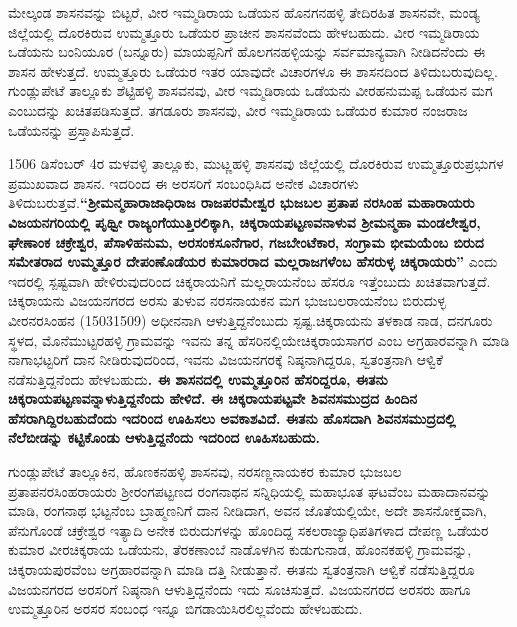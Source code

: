 ಮೇಲ್ಕಂಡ ಶಾಸನವನ್ನು ಬಿಟ್ಟರೆ, ವೀರ ಇಮ್ಮಡಿರಾಯ ಒಡೆಯನ ಹೊನಗನಹಳ್ಳಿ ತೇದಿರಹಿತ ಶಾಸನವೇ, ಮಂಡ್ಯ ಜಿಲ್ಲೆಯಲ್ಲಿ ದೊರಕಿರುವ ಉಮ್ಮತ್ತೂರು ಒಡೆಯರ ಪ್ರಾಚೀನ ಶಾಸನವೆಂದು ಹೇಳಬಹುದು. ವೀರ ಇಮ್ಮಡಿರಾಯ ಒಡೆಯನು ಬಂನಿಯೂರ (ಬನ್ನೂರು) ಮಾಯಪ್ಪನಿಗೆ ಹೊಲಗನಹಳ್ಳಿಯನ್ನು ಸರ್ವಮಾನ್ಯವಾಗಿ ನೀಡಿದನೆಂದು ಈ ಶಾಸನ ಹೇಳುತ್ತದೆ. ಉಮ್ಮತ್ತೂರು ಒಡೆಯರ ಇತರ ಯಾವುದೇ ವಿಚಾರಗಳೂ ಈ ಶಾಸನದಿಂದ ತಿಳಿದುಬರುವುದಿಲ್ಲ. ಗುಂಡ್ಲುಪೇಟೆ ತಾಲ್ಲೂಕು ಶೆಟ್ಟಿಹಳ್ಳಿ ಶಾಸವನವು, ವೀರ ಇಮ್ಮಡಿರಾಯ ಒಡೆಯನು ವೀರಹನುಮಪ್ಪ ಒಡೆಯನ ಮಗ ಎಂಬುದನ್ನು ಖಚಿತಪಡಿಸುತ್ತದೆ. ತಗಡೂರು ಶಾಸನವು, ವೀರ ಇಮ್ಮಡಿರಾಯ ಒಡೆಯರ ಕುಮಾರ ನಂಜರಾಜ ಒಡೆಯನನ್ನು ಪ್ರಸ್ತಾಪಿಸುತ್ತದೆ.

1506 ಡಿಸೆಂಬರ್​ 4ರ ಮಳವಳ್ಳಿ ತಾಲ್ಲೂಕು, ಮುಟ್ಣಹಳ್ಳಿ ಶಾಸನವು ಜಿಲ್ಲೆಯಲ್ಲಿ ದೊರಕಿರುವ ಉಮ್ಮತ್ತೂರು\break ಪ್ರಭುಗಳ ಪ್ರಮುಖವಾದ ಶಾಸನ. ಇದರಿಂದ ಈ ಅರಸರಿಗೆ ಸಂಬಂಧಿಸಿದ ಅನೇಕ ವಿಚಾರಗಳು ತಿಳಿದುಬರುತ್ತವೆ.\break \textbf{“ಶ‍್ರೀಮನ್ಮಹಾರಾಜಾಧಿರಾಜ ರಾಜಪರಮೇಶ್ವರ ಭುಜಬಲ ಪ್ರತಾಪ ನರಸಿಂಹ ಮಹಾರಾಯರು ವಿಜಯನಗರಿಯಲ್ಲಿ ಪೃಥ್ವೀ ರಾಜ್ಯಂಗೆಯುತ್ತಿರಲಿಕ್ಕಾಗಿ, ಚಿಕ್ಕರಾಯಪಟ್ಟಣವನಾಳುವ ಶ‍್ರೀಮನ್ಮಹಾ ಮಂಡಲೇಶ್ವರ, ಘೇಣಾಂಕ ಚಕ್ರೇಶ್ವರ, ಪೆಸಾಳಿಹನುಮ, ಅರಸಂಕಸೂನೆಗಾರ, ಗಜಬೇಂಟೆಕಾರ, ಸಂಗ್ರಾಮ ಭೀಮಯೆಂಬ ಬಿರುದ ಸಮೇತರಾದ ಉಮ್ಮತ್ತೂರ ದೇಪಂಣೊಡೆಯರ ಕುಮಾರರಾದ ಮಲ್ಲರಾಜಗಳೆಂಬ ಹೆಸರುಳ್ಳ ಚಿಕ್ಕರಾಯರು” }ಎಂದು ಇದರಲ್ಲಿ ಸ್ಪಷ್ಟವಾಗಿ ಹೇಳಿರುವುದರಿಂದ ಚಿಕ್ಕರಾಯನಿಗೆ ಮಲ್ಲರಾಯನೆಂಬ ಹೆಸರೂ ಇತ್ತೆಂಬುದು ಖಚಿತವಾಗುತ್ತದೆ. ಚಿಕ್ಕರಾಯನು ವಿಜಯನಗರದ ಅರಸು ತುಳುವ ನರಸನಾಯಕನ ಮಗ ಭುಜಬಲರಾಯನೆಂಬ ಬಿರುದುಳ್ಳ ವೀರನರಸಿಂಹನ (1503\enginline{-}1509) ಅಧೀನನಾಗಿ ಆಳುತ್ತಿದ್ದನೆಂಬುದು ಸ್ಪಷ್ಟ.\break ಚಿಕ್ಕರಾಯನು ತಳಕಾಡ ನಾಡ, ದನಗೂರು ಸ್ಥಳದ, ಮೊನೆಮುಟ್ಟರಹಳ್ಳಿ ಗ್ರಾಮವನ್ನು ಇವನು ತನ್ನ ಹೆಸರಿನಲ್ಲಿಯೇ\break ಚಿಕ್ಕರಾಯಸಾಗರ ಎಂಬ ಅಗ್ರಹಾರವನ್ನಾಗಿ ಮಾಡಿ ನಾಗಾಭಟ್ಟರಿಗೆ ದಾನ ನೀಡಿರುವುದರಿಂದ, ಇವನು ವಿಜಯನಗರಕ್ಕೆ ನಿಷ್ಠನಾಗಿದ್ದರೂ, ಸ್ವತಂತ್ರನಾಗಿ ಆಳ್ವಿಕೆ ನಡೆಸುತ್ತಿದ್ದನೆಂದು ಹೇಳಬಹುದು\textbf{. ಈ ಶಾಸನದಲ್ಲಿ ಉಮ್ಮತ್ತೂರಿನ ಹೆಸರಿದ್ದರೂ, ಈತನು ಚಿಕ್ಕರಾಯಪಟ್ಟಣವನ್ನಾಳುತ್ತಿದ್ದನೆಂದು ಹೇಳಿದೆ. ಈ ಚಿಕ್ಕರಾಯಪಟ್ಟವೇ ಶಿವನಸಮುದ್ರದ ಹಿಂದಿನ ಹೆಸರಾಗಿದ್ದಿರಬಹುದೆಂದು ಇದರಿಂದ ಊಹಿಸಲು ಅವಕಾಶವಿದೆ. ಈತನು ಹೊಸದಾಗಿ ಶಿವನಸಮುದ್ರದಲ್ಲಿ ನೆಲೆಬೀಡನ್ನು ಕಟ್ಟಿಕೊಂಡು ಆಳುತ್ತಿದ್ದನೆಂದು ಇದರಿಂದ ಊಹಿಸಬಹುದು. }

ಗುಂಡ್ಲುಪೇಟೆ ತಾಲ್ಲೂಕಿನ, ಹೊಣಕನಹಳ್ಳಿ ಶಾಸನವು, ನರಸಣ್ಣನಾಯಕರ ಕುಮಾರ ಭುಜಬಲ ಪ್ರತಾಪ\break ನರಸಿಂಹರಾಯರು ಶ‍್ರೀರಂಗಪಟ್ಟಣದ ರಂಗನಾಥನ ಸನ್ನಿಧಿಯಲ್ಲಿ ಮಹಾಭೂತ ಘಟವೆಂಬ ಮಹಾದಾನವನ್ನು ಮಾಡಿ, ರಂಗನಾಥ ಭಟ್ಟನೆಂಬ ಬ್ರಾಹ್ಮಣನಿಗೆ ದಾನ ನೀಡಿದಾಗ, ಅವನ ಜೊತೆಯಲ್ಲಿಯೇ, ಅದೇ ಶಾಸನೋಕ್ತವಾಗಿ, ಪೆನುಗೊಂಡೆ ಚಕ್ರೇಶ್ವರ ಇತ್ಯಾದಿ ಅನೇಕ ಬಿರುದುಗಳನ್ನು ಹೊಂದಿದ್ದ ಸಕಲರಾಜ್ಯಾಧಿಪತಿಗಳಾದ ದೇಪಣ್ಣ ಒಡೆಯರ ಕುಮಾರ ವೀರಚಿಕ್ಕರಾಯ ಒಡೆಯನು, ತೆರಕಣಾಂಬೆ ನಾಡೊಳಗಿನ ಕುಡುಗುನಾಡ, ಹೊಂನಕಹಳ್ಳಿ ಗ್ರಾಮವನ್ನು, ಚಿಕ್ಕರಾಯಪುರವೆಂಬ ಅಗ್ರಹಾರವನ್ನಾಗಿ ಮಾಡಿ ದತ್ತಿ ನೀಡುತ್ತಾನೆ. ಈತನು ಸ್ವತಂತ್ರನಾಗಿ ಆಳ್ವಿಕೆ ನಡೆಸುತ್ತಿದ್ದರೂ ವಿಜಯನಗರದ ಅರಸರಿಗೆ ನಿಷ್ಠನಾಗಿ ಆಳುತ್ತಿದ್ದನೆಂದು ಇದು ಸೂಚಿಸುತ್ತದೆ. ವಿಜಯನಗರದ ಅರಸರು ಹಾಗೂ ಉಮ್ಮತ್ತೂರಿನ ಅರಸರ ಸಂಬಂಧ ಇನ್ನೂ ಬಿಗಡಾಯಿಸಿರಲಿಲ್ಲವೆಂದು ಹೇಳಬಹುದು.


